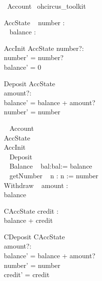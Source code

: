 \documentclass[a4paper,10pt]{article}
\begin{document}
\begin{zsection}
  \SECTION\ Account \parents\ ohcircus\_toolkit
\end{zsection}

\begin{schema}{AccState}
\ohcircpublic ~ number : \nat \\
\ohcircprotected ~ balance : \nat \\
\end{schema}


\begin{schema}{AccInit}
\Delta AccState
number?:\nat\\
\where
number' = number?\\
balance' = 0 
\end{schema}

 
 \begin{schema}{Deposit}
 \Delta AccState\\
 amount?:\nat\\
 \where
 balance' = balance + amount?\\
 number' = number
 \end{schema}

\begin{circus}
  \ohcircclass ~ Account ~ \circdef \circbegin\\  
  \ohcircstate  AccState \\
  \ohcircinitial  AccInit \\
  \ohcircpublic ~ Deposit \\

  \ohcircpublic ~ Balance ~ \circdef  \circres bal:\nat \circspot bal:= balance \\

  \ohcircpublic ~ getNumber ~ \circdef \circres n : \nat \circspot n := number \\

  \ohcircpublic Withdraw ~ \circdef \circval amount : \nat \\
  \circspot  balance \prefixcolon [ amount \leq balance , balance' = balance - amount ]\\

\circend
\end{circus}


\begin{schema}{CAccState}
\ohcircprotected credit : \nat \\
\where
balance + credit 
\end{schema}


 \begin{schema}{CDeposit}
 \Delta CAccState\\
 amount?:\nat\\
 \where
 balance' = balance + amount?\\
 number' = number\\
 credit' = credit 
 \end{schema}
\end{document}
